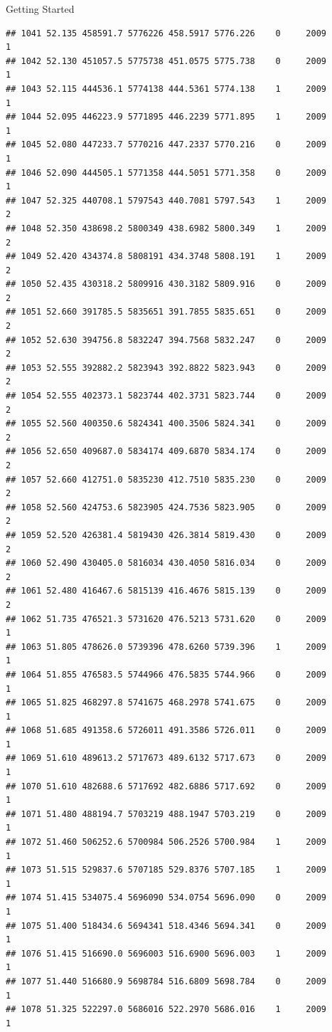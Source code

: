 \documentclass[
  ignorenonframetext,
]{beamer}
\begin{document}
\begin{frame}[fragile]{Getting Started}
\begin{verbatim}
## 1041 52.135 458591.7 5776226 458.5917 5776.226    0     2009        1
## 1042 52.130 451057.5 5775738 451.0575 5775.738    0     2009        1
## 1043 52.115 444536.1 5774138 444.5361 5774.138    1     2009        1
## 1044 52.095 446223.9 5771895 446.2239 5771.895    1     2009        1
## 1045 52.080 447233.7 5770216 447.2337 5770.216    0     2009        1
## 1046 52.090 444505.1 5771358 444.5051 5771.358    0     2009        1
## 1047 52.325 440708.1 5797543 440.7081 5797.543    1     2009        2
## 1048 52.350 438698.2 5800349 438.6982 5800.349    1     2009        2
## 1049 52.420 434374.8 5808191 434.3748 5808.191    1     2009        2
## 1050 52.435 430318.2 5809916 430.3182 5809.916    0     2009        2
## 1051 52.660 391785.5 5835651 391.7855 5835.651    0     2009        2
## 1052 52.630 394756.8 5832247 394.7568 5832.247    0     2009        2
## 1053 52.555 392882.2 5823943 392.8822 5823.943    0     2009        2
## 1054 52.555 402373.1 5823744 402.3731 5823.744    0     2009        2
## 1055 52.560 400350.6 5824341 400.3506 5824.341    0     2009        2
## 1056 52.650 409687.0 5834174 409.6870 5834.174    0     2009        2
## 1057 52.660 412751.0 5835230 412.7510 5835.230    0     2009        2
## 1058 52.560 424753.6 5823905 424.7536 5823.905    0     2009        2
## 1059 52.520 426381.4 5819430 426.3814 5819.430    0     2009        2
## 1060 52.490 430405.0 5816034 430.4050 5816.034    0     2009        2
## 1061 52.480 416467.6 5815139 416.4676 5815.139    0     2009        2
## 1062 51.735 476521.3 5731620 476.5213 5731.620    0     2009        1
## 1063 51.805 478626.0 5739396 478.6260 5739.396    1     2009        1
## 1064 51.855 476583.5 5744966 476.5835 5744.966    0     2009        1
## 1065 51.825 468297.8 5741675 468.2978 5741.675    0     2009        1
## 1068 51.685 491358.6 5726011 491.3586 5726.011    0     2009        1
## 1069 51.610 489613.2 5717673 489.6132 5717.673    0     2009        1
## 1070 51.610 482688.6 5717692 482.6886 5717.692    0     2009        1
## 1071 51.480 488194.7 5703219 488.1947 5703.219    0     2009        1
## 1072 51.460 506252.6 5700984 506.2526 5700.984    1     2009        1
## 1073 51.515 529837.6 5707185 529.8376 5707.185    1     2009        1
## 1074 51.415 534075.4 5696090 534.0754 5696.090    0     2009        1
## 1075 51.400 518434.6 5694341 518.4346 5694.341    0     2009        1
## 1076 51.415 516690.0 5696003 516.6900 5696.003    1     2009        1
## 1077 51.440 516680.9 5698784 516.6809 5698.784    0     2009        1
## 1078 51.325 522297.0 5686016 522.2970 5686.016    1     2009        1

\end{verbatim}
\end{frame}
\end{document}
